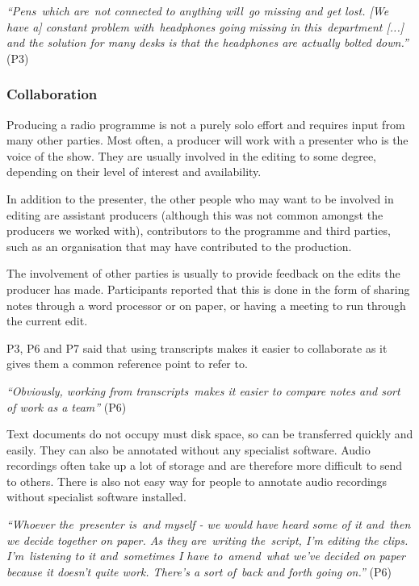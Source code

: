 \textit{``Pens which are not connected to anything will go missing and get lost.
  [We have a] constant problem with headphones going missing in this department [...]
  and the solution for many desks is that the headphones are actually bolted down.''} (P3)

\subsubsection{Collaboration}


Producing a radio programme is not a purely solo effort and requires input from many other parties. Most
often, a producer will work with a presenter who is the voice of the show. They are usually involved in the
editing to some degree, depending on their level of interest and availability.

In addition to the presenter, the other people who may want to be involved in editing are assistant producers (although
this was not common amongst the producers we worked with), contributors to the programme and third parties, such as an
organisation that may have contributed to the production.

The involvement of other parties is usually to provide feedback on the edits the producer has made. Participants
reported that this is done in the form of sharing notes through a word processor or on paper, or having a meeting to
run through the current edit.


P3, P6 and P7 said that using transcripts makes it easier to collaborate as it gives them a common reference point to
refer to.

\textit{``Obviously, working from transcripts makes it easier to compare notes and sort of work as a team''} (P6)

Text documents do not occupy must disk space, so can be transferred quickly and easily.
They can also be annotated without any specialist software. Audio recordings often take up a lot of storage and are
therefore more difficult to send to others. There is also not easy way for people to annotate audio recordings without
specialist software installed.

\textit{``Whoever the presenter is and myself - we would have heard some of it and then we decide together on paper. As
they are writing the script, I'm editing the clips. I'm listening to it and sometimes I have to amend what we've
decided on paper because it doesn't quite work. There's a sort of back and forth going on.''} (P6)

